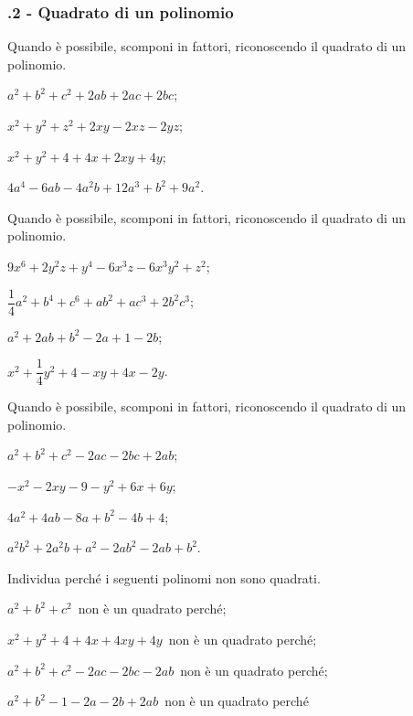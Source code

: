 \subsubsection*{\thechapter.2 - Quadrato di un polinomio}
\begin{multicols}{2}
\begin{esercizio}
\label{ese:16.13}
Quando è possibile, scomponi in fattori, riconoscendo il quadrato di un polinomio.
\begin{enumeratea}
 \item $a^{2}+b^{2}+c^{2}+2ab+2ac+2bc$;
 \item $x^{2}+y^{2}+z^{2}+2xy-2xz-2yz$;
 \item $x^{2}+y^{2}+4+4x+2xy+4y$;
 \item $4a^{4}-6{ab}-4a^{2}b+12a^{3}+b^{2}+9a^{2}$.
\end{enumeratea}
\end{esercizio}

\begin{esercizio}
Quando è possibile, scomponi in fattori, riconoscendo il quadrato di un polinomio.
\label{ese:16.14}
\begin{enumeratea}
 \item $9x^{6}+2y^{2}z+y^{4}-6x^{3}z-6x^{3}y^{2}+z^{2}$;
 \item $\dfrac{1}{4}a^{2}+b^{4}+c^{6}+ab^{2}+{ac}^{3}+2b^{2}c^{3}$;
 \item $a^{2}+2ab+b^{2}-2a+1-2b$;
 \item $x^{2}+\dfrac{1}{4}y^{2}+4-xy+4x-2y$.
\end{enumeratea}
\end{esercizio}

\begin{esercizio}
\label{ese:16.15}
Quando è possibile, scomponi in fattori, riconoscendo il quadrato di un polinomio.
\begin{enumeratea}
 \item $a^{2}+b^{2}+c^{2}-2ac-2bc+2ab$;
 \item $-x^{2}-2xy-9-y^{2}+6x+6y$;
 \item $4a^{2}+4ab-8a+b^{2}-4b+4$;
 \item $a^{2}b^{2}+2a^{2}b+a^{2}-2ab^{2}-2ab+b^{2}$.
\end{enumeratea}
\end{esercizio}
\end{multicols}
\begin{esercizio}
Individua perché i seguenti polinomi non sono quadrati.
\label{ese:16.16}
\begin{enumeratea}
 \item $a^{2}+b^{2}+c^{2}$\, non è un quadrato perché\dotfill;
 \item $x^{2}+y^{2}+4+4x+4xy+4y$\, non è un quadrato perché\dotfill;
 \item $a^{2}+b^{2}+c^{2}-2ac-2bc-2ab$\, non è un quadrato perché\dotfill;
 \item $a^{2}+b^{2}-1-2a-2b+2ab$\, non è un quadrato perché\dotfill
\end{enumeratea}
\end{esercizio}

